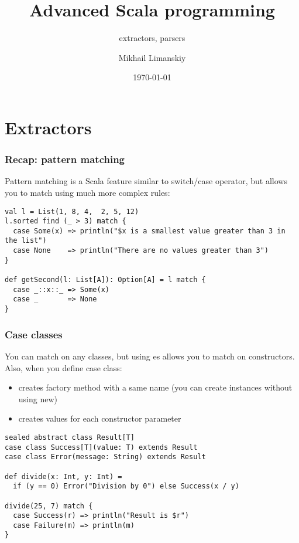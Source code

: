 \documentclass{beamer}
\title{Advanced Scala programming}
\subtitle{extractors, parsers}
\author{Mikhail Limanskiy}
\institute{SymphonyTeleca}
\date{\today}
\begin{document}
\begin{frame}
    \titlepage
\end{frame}

\section{Extractors}

\begin{frame}[fragile]
\frametitle{Recap: pattern matching}
Pattern matching is a Scala feature similar to switch/case operator, but allows you to match
using much more complex rules:
\begin{example}
\begin{lstlisting}
val l = List(1, 8, 4,  2, 5, 12)
l.sorted find (_ > 3) match {
  case Some(x) => println("$x is a smallest value greater than 3 in the list")
  case None    => println("There are no values greater than 3")
}

def getSecond(l: List[A]): Option[A] = l match {
  case _::x::_ => Some(x)
  case _       => None
}
\end{lstlisting}
\end{example}
\end{frame}

\begin{frame}[fragile]
\frametitle{Case classes}
You can match on any classes, but using es allows you to match on constructors.
Also, when you define case class:
\begin{itemize}
\item creates factory method with a same name (you can create instances without using new)
\item creates values for each constructor parameter
\end{itemize}
\begin{example}
\begin{lstlisting}
sealed abstract class Result[T]
case class Success[T](value: T) extends Result
case class Error(message: String) extends Result

def divide(x: Int, y: Int) = 
  if (y == 0) Error("Division by 0") else Success(x / y)

divide(25, 7) match {
  case Success(r) => println("Result is $r")
  case Failure(m) => println(m)
}
\end{lstlisting}
\end{example}
\end{frame}
\end{document}
